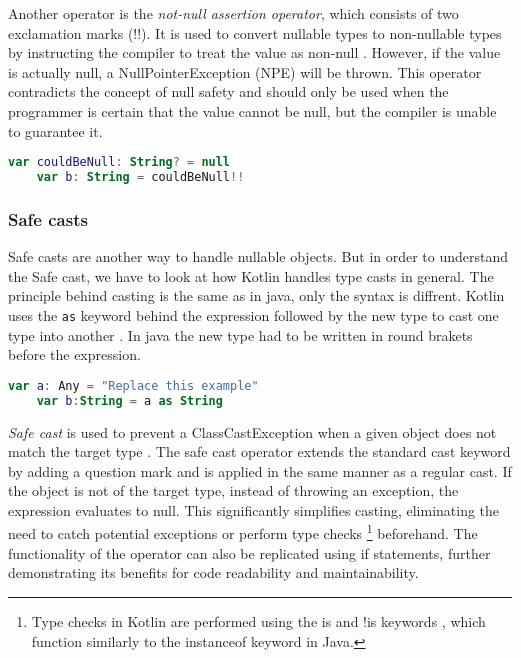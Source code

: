 \documentclass[a4paper, 11pt]{article}
\begin{document}
  Another operator is the \textit{not-null assertion operator}, which consists of two exclamation marks (!!). It is used to convert nullable types to non-nullable types by instructing the compiler to treat the value as non-null \cite{nullsafety-assertion}. However, if the value is actually null, a NullPointerException (NPE) will be thrown. This operator contradicts the concept of null safety and should only be used when the programmer is certain that the value cannot be null, but the compiler is unable to guarantee it.
  \begin{lstlisting}[language=Kotlin,title={Usage of the not-null assertion}]
    var couldBeNull: String? = null
    var b: String = couldBeNull!!
  \end{lstlisting}

\subsubsection{Safe casts}
  Safe casts are another way to handle nullable objects. But in order to understand the Safe cast, we have to look at how Kotlin handles type casts in general. The principle behind casting is the same as in java, only the syntax is diffrent. Kotlin uses the \texttt{as} keyword behind the expression followed by the new type to cast one type into another \cite{casting}. In java the new type had to be written in round brakets before the expression.
  \begin{lstlisting}[language=Kotlin,title={Casting in Kotlin}]
    var a: Any = "Replace this example"
    var b:String = a as String
  \end{lstlisting} %
  \textit{Safe cast} is used to prevent a ClassCastException when a given object does not match the target type \cite{nullsafety-safe-cast}. The safe cast operator extends the standard cast keyword by adding a question mark and is applied in the same manner as a regular cast. If the object is not of the target type, instead of throwing an exception, the expression evaluates to null. This significantly simplifies casting, eliminating the need to catch potential exceptions or perform type checks \footnote{Type checks in Kotlin are performed using the is and !is keywords \cite{casting-is-operator}, which function similarly to the instanceof keyword in Java.} beforehand. The functionality of the operator can also be replicated using if statements, further demonstrating its benefits for code readability and maintainability.
\end{document}
